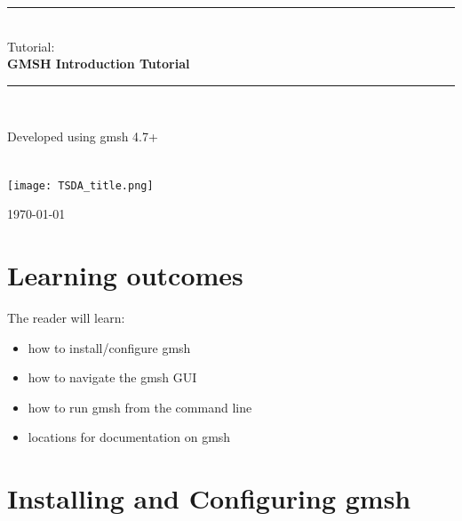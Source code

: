 \documentclass{report}
\newcommand{\HRule}{\rule{\linewidth}{0.5mm}}
\begin{document}
 \begin{titlepage}
  \begin{center}
 
 
	

	

        \HRule \\[0.4cm]
        Tutorial:\\[0.2cm]
	{ \huge \bfseries GMSH Introduction Tutorial}\\[0.4cm]
	\HRule \\[1cm]

        \begin{minipage}{0.35\textwidth}
        Developed using gmsh 4.7+ \newline \newline \newline \newline \newline \newline \newline \\
	\end{minipage}\\[1cm]

	

	\texttt{[image: TSDA\_title.png]}
	
	\vfill


	{\large \today}
	 
	\end{center}

 \end{titlepage}


\chapter*{Learning outcomes}

\noindent The reader will learn:\\[0.4cm]

\begin{itemize}
\item how to install/configure gmsh
\item how to navigate the gmsh GUI
\item how to run gmsh from the command line
\item locations for documentation on gmsh
\end{itemize}


\tableofcontents


\chapter{Installing and Configuring gmsh}
\end{document}
